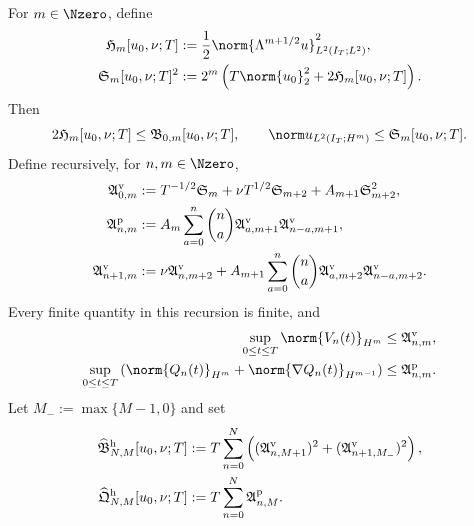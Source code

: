 \begin{proposition}
\label{u:prop:qc-critical-height-row-propagation}
For \(m\in\Nzero\), define
\begin{align}
 \mathfrak H_m[u_0,\nu;T]
 &:={}
 \frac12\norm{\Lambda^{m+1/2}u}_{L^2(I_T;L^2)}^2,
 \label{u:eq:qc-height-producer-coordinate}\\
 \mathfrak S_m[u_0,\nu;T]^2
 &:={}
 2^m\left(T\norm{u_0}_2^2+2\mathfrak H_m[u_0,\nu;T]\right).
 \label{u:eq:qc-spatial-row-from-height}
\end{align}
Then
\begin{equation}
 2\mathfrak H_m[u_0,\nu;T]
 \le\mathfrak B_{0,m}[u_0,\nu;T],
 \qquad
 \norm u_{L^2(I_T;H^m)}\le\mathfrak S_m[u_0,\nu;T].
 \label{u:eq:qc-height-spatial-bounds}
\end{equation}
Define recursively, for \(n,m\in\Nzero\),
\begin{align}
 \mathfrak A^{\rm v}_{0,m}
 &:={}
 T^{-1/2}\mathfrak S_m
 +\nu T^{1/2}\mathfrak S_{m+2}
 +A_{m+1}\mathfrak S_{m+2}^2,
 \label{u:eq:qc-height-base-pointwise-majorant}\\
 \mathfrak A^{\rm p}_{n,m}
 &:={}
 A_m\sum_{a=0}^{n}\binom na
 \mathfrak A^{\rm v}_{a,m+1}
 \mathfrak A^{\rm v}_{n-a,m+1},
 \label{u:eq:qc-height-pressure-majorant}\\
 \mathfrak A^{\rm v}_{n+1,m}
 &:={}
 \nu\mathfrak A^{\rm v}_{n,m+2}
 +A_{m+1}\sum_{a=0}^{n}\binom na
 \mathfrak A^{\rm v}_{a,m+2}
 \mathfrak A^{\rm v}_{n-a,m+2}.
 \label{u:eq:qc-height-temporal-majorant}
\end{align}
Every finite quantity in this recursion is finite, and
\begin{align}
 \sup_{0\le t\le T}\norm{V_n(t)}_{H^m}
 &\le\mathfrak A^{\rm v}_{n,m},
 \label{u:eq:qc-height-temporal-row-bound}\\
 \sup_{0\le t\le T}
 \left(\norm{Q_n(t)}_{H^m}
 +\norm{\nabla Q_n(t)}_{H^{m-1}}\right)
 &\le\mathfrak A^{\rm p}_{n,m}.
 \label{u:eq:qc-height-pressure-row-bound}
\end{align}
Let \(M_-:=\max\{M-1,0\}\) and set
\begin{align}
 \widehat{\mathfrak B}_{N,M}^{\rm h}[u_0,\nu;T]
 &:={}
 T\sum_{n=0}^{N}\left(
 (\mathfrak A^{\rm v}_{n,M+1})^2
 +(\mathfrak A^{\rm v}_{n+1,M_-})^2
 \right),
 \label{u:eq:qc-height-reconstructed-rectangle}\\
 \widehat{\mathfrak Q}_{N,M}^{\rm h}[u_0,\nu;T]
 &:={}
 T\sum_{n=0}^{N}\mathfrak A^{\rm p}_{n,M}.
 \label{u:eq:qc-height-reconstructed-pressure}

\end{align}
\end{proposition}
